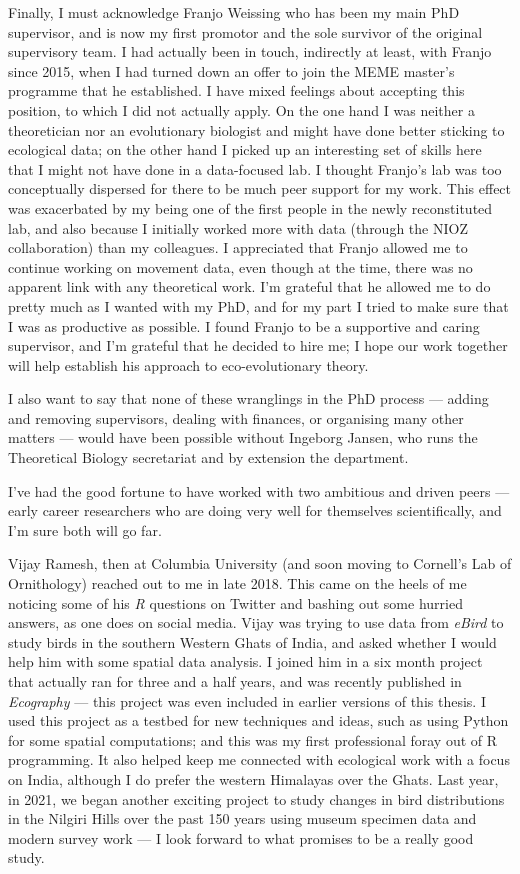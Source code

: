 Finally, I must acknowledge Franjo Weissing who has been my main PhD supervisor, and is now my first promotor and the sole survivor of the original supervisory team.
I had actually been in touch, indirectly at least, with Franjo since 2015, when I had turned down an offer to join the MEME master's programme that he established.
I have mixed feelings about accepting this position, to which I did not actually apply.
On the one hand I was neither a theoretician nor an evolutionary biologist and might have done better sticking to ecological data; on the other hand I picked up an interesting set of skills here that I might not have done in a data-focused lab.
I thought Franjo's lab was too conceptually dispersed for there to be much peer support for my work.
This effect was exacerbated by my being one of the first people in the newly reconstituted lab, and also because I initially worked more with data (through the NIOZ collaboration) than my colleagues.
I appreciated that Franjo allowed me to continue working on movement data, even though at the time, there was no apparent link with any theoretical work.
I'm grateful that he allowed me to do pretty much as I wanted with my PhD, and for my part I tried to make sure that I was as productive as possible.
I found Franjo to be a supportive and caring supervisor, and I'm grateful that he decided to hire me; I hope our work together will help establish his approach to eco-evolutionary theory.

I also want to say that none of these wranglings in the PhD process --- adding and removing supervisors, dealing with finances, or organising many other matters --- would have been possible without Ingeborg Jansen, who runs the Theoretical Biology secretariat and by extension the department.

\medskip

I've had the good fortune to have worked with two ambitious and driven peers --- early career researchers who are doing very well for themselves scientifically, and I'm sure both will go far.

\noindent Vijay Ramesh, then at Columbia University (and soon moving to Cornell's Lab of Ornithology) reached out to me in late 2018.
This came on the heels of me noticing some of his \textit{R} questions on Twitter and bashing out some hurried answers, as one does on social media.
Vijay was trying to use data from \textit{eBird} to study birds in the southern Western Ghats of India, and asked whether I would help him with some spatial data analysis.
I joined him in a six month project that actually ran for three and a half years, and was recently published in \textit{Ecography} --- this project was even included in earlier versions of this thesis.
I used this project as a testbed for new techniques and ideas, such as using Python for some spatial computations; and this was my first professional foray out of R programming.
It also helped keep me connected with ecological work with a focus on India, although I do prefer the western Himalayas over the Ghats.
Last year, in 2021, we began another exciting project to study changes in bird distributions in the Nilgiri Hills over the past 150 years using museum specimen data and modern survey work --- I look forward to what promises to be a really good study.

